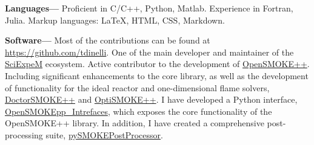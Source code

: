 {\bf Languages---}
Proficient in C/C++, Python, Matlab. Experience in Fortran, Julia. Markup
languages: \LaTeX, HTML, CSS, Markdown.


{\bf Software---}
Most of the contributions can be found at
\href{https://github.com/tdinelli}{https://github.com/tdinelli}. One of the main developer and maintainer of the \href{https://sciexpem.polimi.it/}{SciExpeM} ecosystem. Active contributor to the development of \href{https://www.opensmokepp.polimi.it/}{OpenSMOKE++}. Including significant enhancements to the core library, as well as the development of functionality for the ideal reactor and one-dimensional flame solvers, \href{https://www.opensmokepp.polimi.it/}{DoctorSMOKE++} and \href{https://github.com/burn-research/OptiSMOKE_toolbox}{OptiSMOKE++}. I have developed a Python interface, \href{https://github.com/tdinelli/OpenSMOKEpp_Interfaces}{OpenSMOKEpp\_Intrefaces}, which exposes the core functionality of the OpenSMOKE++ library. In addition, I have created a comprehensive post-processing suite, \href{https://github.com/tdinelli/pySMOKEPostProcessor}{pySMOKEPostProcessor}.
